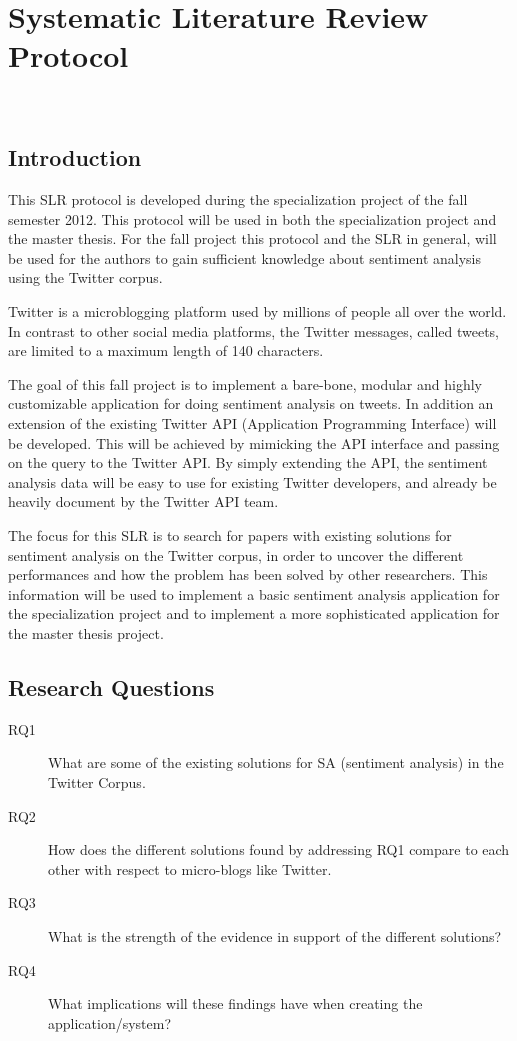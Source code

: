 
\chapter{Systematic Literature Review Protocol}~\label{apx:slrp}

\section{Introduction}

This SLR protocol is developed during the specialization project of the fall semester 2012. This protocol will be used in both the specialization project and the master thesis. For the fall project this protocol and the SLR in general, will be used for the authors to gain sufficient knowledge about sentiment analysis using the Twitter corpus.  

Twitter is a microblogging platform used by millions of people all over the world. In contrast to other social media platforms, the Twitter messages, called tweets, are limited to a maximum length of 140 characters.

The goal of this fall project is to implement a bare-bone, modular and highly customizable application for doing sentiment analysis on tweets. In addition an extension of the existing Twitter API (Application Programming Interface) will be developed. This will be achieved by mimicking the API interface and passing on the query to the Twitter API. By simply extending the API, the sentiment analysis data will be easy to use for existing Twitter developers, and already be heavily document by the Twitter API team. 

The focus for this SLR is to search for papers with existing solutions for sentiment analysis on the Twitter corpus, in order to uncover the different performances and how the problem has been solved by other researchers. This information will be used to implement a basic sentiment analysis application for the specialization project and to implement a more sophisticated application for the master thesis project. 

\section{Research Questions}

\begin{description}

\item[RQ1] What are some of the existing solutions for SA (sentiment analysis) in the Twitter Corpus.
\item[RQ2] How does the different solutions found by addressing RQ1 compare to each other with respect to micro-blogs like Twitter.
\item[RQ3] What is the strength of the evidence in support of the different solutions?
\item[RQ4] What implications will these findings have when creating the application/system?

\end{description}

